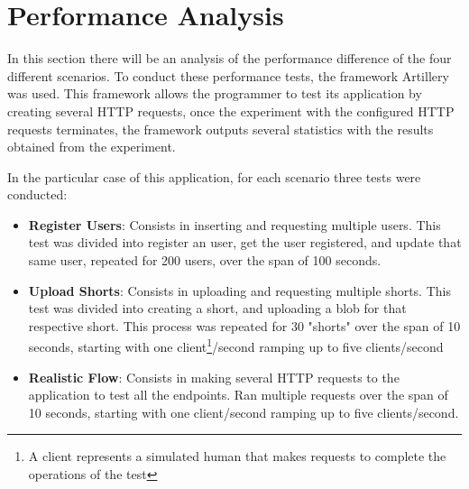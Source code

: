 \documentclass[10pt,a4paper,twocolumn]{article}
\begin{document}
\section{Performance Analysis}
\label{sec:Perf}
In this section there will be an analysis of the performance difference of the four different scenarios. To conduct these performance tests, the framework Artillery\cite{artillery} was used. This framework allows the programmer to test its application by creating several HTTP requests, once the experiment with the configured HTTP requests terminates, the framework outputs several statistics with the results obtained from the experiment.
\par In the particular case of this application, for each scenario three tests were conducted:
\begin{itemize}
  \item \textbf{Register Users}: Consists in inserting and requesting multiple users. This test was divided into register an user, get the user registered, and update that same user, repeated for 200 users, over the span of 100 seconds. 
  \item \textbf{Upload Shorts}: Consists in uploading and requesting multiple shorts. This test was divided into creating a short, and uploading a blob for that respective short. This process was repeated for 30 "shorts" over the span of 10 seconds, starting with one client\footnote{A client represents a simulated human that makes requests to complete the operations of the test}/second ramping up to five clients/second
  \item \textbf{Realistic Flow}: Consists in making several HTTP requests to the application to test all the endpoints. Ran multiple requests over the span of 10 seconds, starting with one client/second ramping up to five clients/second.
\end{itemize}
  
\end{document}
